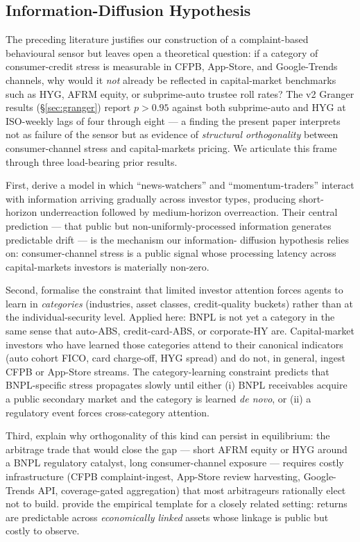 \documentclass[11pt,letterpaper]{article}
\begin{document}
\subsection{Information-Diffusion Hypothesis}
\label{sec:infodiff}

The preceding literature justifies our construction of a complaint-based
behavioural sensor but leaves open a theoretical question: if a
category of consumer-credit stress is measurable in CFPB, App-Store, and
Google-Trends channels, why would it \emph{not} already be reflected in
capital-market benchmarks such as HYG, AFRM equity, or subprime-auto
trustee roll rates? The v2 Granger results (\S\ref{sec:granger}) report
$p > 0.95$ against both subprime-auto and HYG at ISO-weekly lags of
four through eight --- a finding the present paper interprets not as
failure of the sensor but as evidence of \emph{structural orthogonality}
between consumer-channel stress and capital-markets pricing. We
articulate this frame through three load-bearing prior results.

First, \citet{hongstein1999unified} derive a model in which
``news-watchers'' and ``momentum-traders'' interact with information
arriving gradually across investor types, producing short-horizon
underreaction followed by medium-horizon overreaction. Their central
prediction --- that public but non-uniformly-processed information
generates predictable drift --- is the mechanism our information-
diffusion hypothesis relies on: consumer-channel stress is a public
signal whose processing latency across capital-markets investors
is materially non-zero.

Second, \citet{pengxiong2006category} formalise the constraint that
limited investor attention forces agents to learn in \emph{categories}
(industries, asset classes, credit-quality buckets) rather than at the
individual-security level. Applied here: BNPL is not yet a category in
the same sense that auto-ABS, credit-card-ABS, or corporate-HY are.
Capital-market investors who have learned those categories attend to
their canonical indicators (auto cohort FICO, card charge-off, HYG
spread) and do not, in general, ingest CFPB or App-Store streams. The
category-learning constraint predicts that BNPL-specific stress
propagates slowly until either (i) BNPL receivables acquire a public
secondary market and the category is learned \emph{de novo}, or (ii)
a regulatory event forces cross-category attention.

Third, \citet{shleifervishny1997limits} explain why orthogonality of
this kind can persist in equilibrium: the arbitrage trade that would
close the gap --- short AFRM equity or HYG around a BNPL regulatory
catalyst, long consumer-channel exposure --- requires costly
infrastructure (CFPB complaint-ingest, App-Store review harvesting,
Google-Trends API, coverage-gated aggregation) that most arbitrageurs
rationally elect not to build. \citet{cohenfrazzini2008economic}
provide the empirical template for a closely related setting:
returns are predictable across \emph{economically linked} assets
whose linkage is public but costly to observe.
\end{document}
